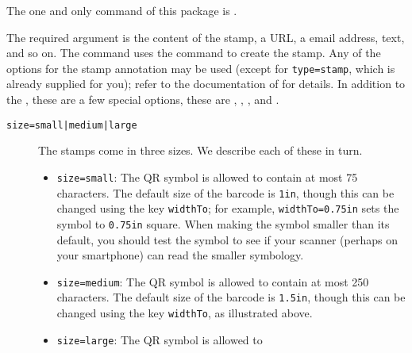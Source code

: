 \documentclass{article}
\begin{document}
The one and only command of this package is .
\bVerb{}%
\begin{dCmd}[commandchars=!()]{\bxSize}
\end{dCmd}
\eVerb The required  argument is the content of the stamp, a
URL, a email address, text, and so on. The  command uses the
 command to create the stamp. Any of the options for the stamp
annotation may be used (except for \texttt{type=stamp}, which is already
supplied for you); refer to the documentation of  for details.
In addition to the , these are a few special options, these are
, , , and .
\begin{description}
    \item[\texttt{size=small|medium|large}] The stamps come in three sizes.
        We describe each of these in turn.
    \begin{itemize}
            \item \texttt{size=small}: The QR symbol is allowed to
                contain at most 75
                characters. The default size of the barcode is
                \texttt{1in}, though this can be changed using
                the key \texttt{widthTo}; for example,
                \texttt{widthTo=0.75in} sets the symbol to
                \texttt{0.75in} square. When making the symbol smaller
                than its default, you should test the symbol to see if
                your scanner (perhaps on your smartphone) can read the
                smaller symbology.
            \item \texttt{size=medium}: The QR symbol is allowed to
                contain at most 250
                characters.
                The default size of the barcode is
                \texttt{1.5in}, though this can be changed using
                the key \texttt{widthTo}, as illustrated above.
            \item \texttt{size=large}: The QR symbol is allowed to

\end{itemize}
\end{description}
\end{document}
